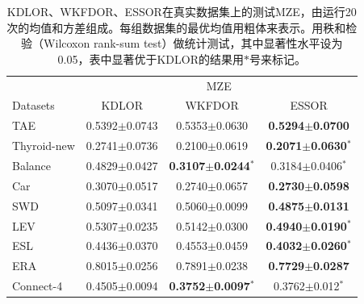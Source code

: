 \begin{table}[!htbp]
\caption{KDLOR、WKFDOR、ESSOR在真实数据集上的测试MZE，由运行20次的均值和方差组成。每组数据集的最优均值用粗体来表示。用秩和检验（Wilcoxon rank-sum test）做统计测试，其中显著性水平设为0.05，表中显著优于KDLOR的结果用$*$号来标记。}
\label{table_essor_mze}
\centering
\begin{tabular}{l|ccc}
\toprule
& \multicolumn {3}{c}{MZE} \\
 \cmidrule {2-4}
Datasets & KDLOR & WKFDOR & ESSOR \\
\midrule
TAE & 0.5392$\pm$0.0743 & 0.5353$\pm$0.0630 &  {\bf 0.5294$\pm$0.0700} \\
Thyroid-new  & 0.2741$\pm$0.0736 & 0.2100$\pm$0.0619 &  {\bf 0.2071$\pm$0.0630}$^{*}$ \\
Balance & 0.4829$\pm$0.0427 & {\bf 0.3107$\pm$0.0244}$^{*}$ &  0.3184$\pm$0.0406$^{*}$ \\
Car & 0.3070$\pm$0.0517 & 0.2740$\pm$0.0657 &  {\bf 0.2730$\pm$0.0598} \\
SWD & 0.5097$\pm$0.0341 & 0.5060$\pm$0.0099 &  {\bf 0.4875$\pm$0.0131} \\
LEV & 0.5307$\pm$0.0235 & 0.5142$\pm$0.0300 &  {\bf 0.4940$\pm$0.0190}$^{*}$ \\
ESL & 0.4436$\pm$0.0370 & 0.4553$\pm$0.0459 &  {\bf 0.4032$\pm$0.0260}$^{*}$ \\
ERA  & 0.8015$\pm$0.0256 & 0.7891$\pm$0.0238 & {\bf 0.7729$\pm$0.0287} \\
Connect-4 & 0.4505$\pm$0.0094 & {\bf 0.3752$\pm$0.0097}$^{*}$ & 0.3762$\pm$0.012$^{*}$ \\
\bottomrule
\end{tabular}
\end{table}

